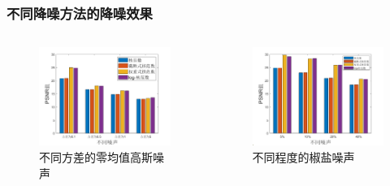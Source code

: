 \documentclass[10pt,aspectratio=43,mathserif]{beamer}
\begin{document}
\begin{frame}
\frametitle{\textbf{不同降噪方法的降噪效果}}
\begin{columns}
\begin{figure}
\centering
\includegraphics[scale=0.2]{exp-type-gaussian.png}
\caption{不同方差的零均值高斯噪声}
\end{figure}
\begin{figure}
\centering
\includegraphics[scale=0.2]{exp-type-pepperandsalt.png}
\caption{不同程度的椒盐噪声}
\end{figure}
\end{columns}
\begin{figure}
\centering

\end{figure}
\end{frame}
\end{document}
